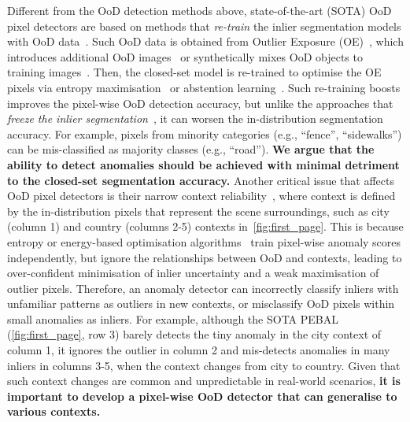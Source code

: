\documentclass[10pt,twocolumn,letterpaper]{article}
\begin{document}
Different from the OoD detection methods above, state-of-the-art (SOTA) OoD pixel detectors are based on methods that \textit{re-train} the inlier segmentation models with OoD data~\cite{chan2021entropy,tian2021pixel,grcic2022densehybrid}.
Such OoD data is obtained from Outlier Exposure (OE)~\cite{hendrycks2018deep}, which introduces additional OoD images~\cite{chan2021entropy} or synthetically mixes OoD objects to training images~\cite{tian2021pixel,grcic2022densehybrid}. 
Then, the closed-set model is re-trained to optimise the OE pixels via entropy maximisation~\cite{chan2021entropy} or abstention learning~\cite{tian2021pixel}. 
Such re-training boosts 
improves the pixel-wise OoD detection accuracy, but unlike the approaches that \textit{freeze the inlier segmentation}~\cite{jung2021standardized, hendrycks2016baseline}, it can  worsen the in-distribution segmentation accuracy. 
For example, pixels from minority categories (e.g., ``fence'', ``sidewalks'') can be mis-classified as majority classes (e.g., ``road''). 
\textbf{We argue that the ability to detect anomalies should be achieved with minimal detriment to the closed-set segmentation accuracy.} 
Another critical issue that affects OoD pixel detectors is their narrow context reliability~\cite{tian2021pixel,chan2021entropy,grcic2022densehybrid,di2021pixel,jung2021standardized},
where context is defined by the in-distribution pixels that represent the scene surroundings, 
such as city (column 1) and country (columns 2-5) contexts in~\cref{fig:first_page}. 
This is because entropy or energy-based optimisation algorithms~\cite{chan2021entropy,di2021pixel,tian2021pixel} train pixel-wise anomaly scores independently, but ignore the relationships between OoD and contexts, leading to over-confident minimisation of inlier uncertainty and a weak maximisation of outlier pixels.
Therefore, an anomaly detector can incorrectly classify inliers with unfamiliar patterns as outliers in new contexts, or misclassify OoD pixels within small anomalies as inliers.  
For example, although the SOTA PEBAL~\cite{tian2021pixel} (\cref{fig:first_page}, row 3) barely detects the tiny anomaly in the city context of column 1, it ignores the outlier in column 2 and mis-detects anomalies in many inliers in columns 3-5, when the context changes from city to country.  
Given that such context changes are common and unpredictable in real-world scenarios,
\textbf{it is important to develop a pixel-wise OoD detector that can generalise to various contexts.} 
\end{document}
